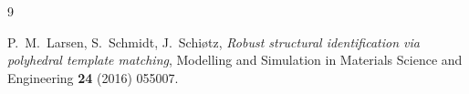 \documentclass[11pt,a4paper]{article}
\begin{document}
\begin{thebibliography}{9}

P.~M.~Larsen, S.~Schmidt, J.~Schi\o{}tz,
\emph{Robust structural identification via polyhedral template matching},
Modelling and Simulation in Materials Science and Engineering \textbf{24} (2016) 055007.

\end{thebibliography}
\end{document}
